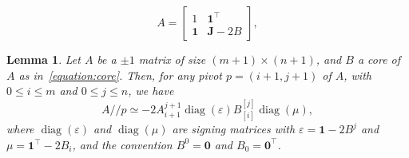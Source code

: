 \documentclass[10pt,a4paper]{amsart}
\newtheorem{lemma}{Lemma}
\DeclareMathOperator{\diag}{diag}
\renewcommand*{\leq}{\leqslant}
\newcommand{\trim}{/\!\!/}
\begin{document}
\begin{equation}\label{equation:core}
A=\begin{bmatrix}
1 & \mathbf{1}^\top \\
\mathbf{1} & \mathbf{J} - 2B
\end{bmatrix},
\end{equation}

\begin{lemma}\label{lemma:trimming_and_complement_orbit}
Let $A$ be a $\pm1$ matrix of size $(m+1)\times(n+1)$, and $B$ a core of $A$ as in~\eqref{equation:core}.
Then, for any pivot $p=(i+1,j+1)$ of $A$, with $0\leq i\leq m$ and $0\leq j \leq n$, we have
\begin{equation}\label{equation:trim_complement}
A\trim p \simeq -2A_{i+1}^{j+1}\diag(\varepsilon) B^{[j]}_{[i]}\diag(\mu),
\end{equation}
where $\diag(\varepsilon)$ and $\diag(\mu)$ are signing matrices with $\varepsilon = \mathbf{1} -2 B^j$ and $\mu=\mathbf{1}^\top -2 B_i$, and the convention $B^0=\mathbf{0}$ and $B_0=\mathbf{0}^\top$.
\end{lemma}
\end{document}
